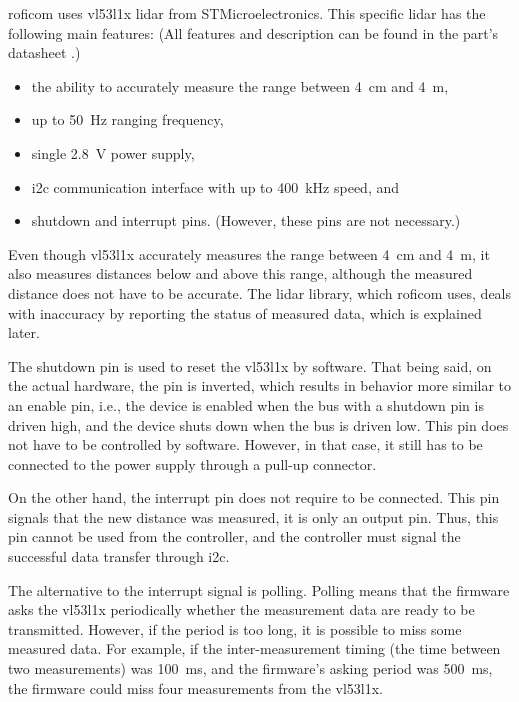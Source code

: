 \documentclass[
  digital,     %
  oneside,     %
  nosansbold,  %
  nocolorbold, %
  nolof,         %
  nolot,         %
]{fithesis4}
\begin{document}
\acrshort{roficom} uses \gls{vl53l1x} \acrshort{lidar} from STMicroelectronics. This specific
\acrshort{lidar} has the following main features: (All features and description can be found in the
part's datasheet \cite{vl53l1x}.)

\begin{itemize}
    \item the ability to accurately measure the range between \qty{4}{\centi\metre} and \qty{4}{\metre},
    \item up to \qty{50}{\hertz} ranging frequency,
    \item single \qty{2.8}{\volt} power supply,
    \item \acrshort{i2c} communication interface with up to \qty{400}{\kilo\hertz} speed, and
    \item shutdown and interrupt pins. (However, these pins are not necessary.)
\end{itemize}

Even though \gls{vl53l1x} accurately measures the range between \qty{4}{\centi\metre} and
\qty{4}{\metre}, it also measures distances below and above this range, although the measured
distance does not have to be accurate. The lidar library, which \acrshort{roficom} uses, deals with
inaccuracy by reporting the status of measured data, which is explained later.

The shutdown pin is used to reset the \gls{vl53l1x} by software. That being said, on the actual
hardware, the pin is inverted, which results in behavior more similar to an enable pin, i.e., the
device is enabled when the bus with a shutdown pin is driven high, and the device shuts down when
the bus is driven low. This pin does not have to be controlled by software. However, in that case,
it still has to be connected to the power supply through a pull-up connector.

On the other hand, the interrupt pin does not require to be connected. This pin signals that the new
distance was measured, it is only an output pin. Thus, this pin cannot be used from the controller,
and the controller must signal the successful data transfer through \acrshort{i2c}.

The alternative to the interrupt signal is polling. Polling means that the firmware asks the
\gls{vl53l1x} periodically whether the measurement data are ready to be transmitted. However, if the
period is too long, it is possible to miss some measured data. For example, if the inter-measurement
timing (the time between two measurements) was \qty{100}{\milli\second}, and the firmware's asking
period was \qty{500}{\milli\second}, the firmware could miss four measurements from the
\gls{vl53l1x}.
\end{document}
